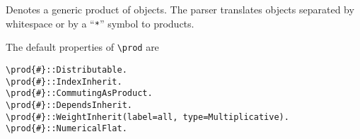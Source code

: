 
Denotes a generic product of objects. The parser translates objects
separated by whitespace or by a ``\verb|*|'' symbol to products. 

The default properties of \verb|\prod| are
\begin{verbatim}
\prod{#}::Distributable.
\prod{#}::IndexInherit.
\prod{#}::CommutingAsProduct.
\prod{#}::DependsInherit.
\prod{#}::WeightInherit(label=all, type=Multiplicative).
\prod{#}::NumericalFlat.
\end{verbatim}
~

